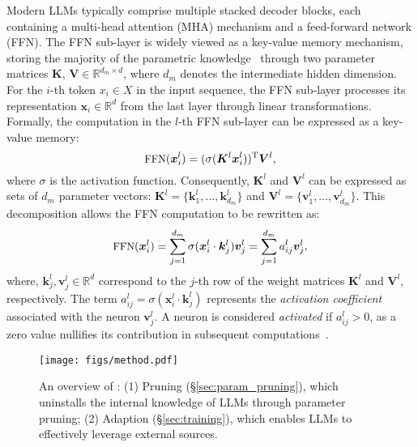 Modern LLMs typically comprise multiple stacked decoder blocks, each containing a multi-head attention (MHA) mechanism and a feed-forward network (FFN). The FFN sub-layer is widely viewed as a key-value memory mechanism, storing the majority of the parametric knowledge~\cite{geva2020transformer} through two parameter matrices $\bm{K}$, $\bm{V} \in \mathbb{R}^{d_m \times d}$, where $d_m$ denotes the intermediate hidden dimension. For the $i$-th token $x_i \in X$ in the input sequence, the FFN sub-layer processes its representation $\bm{x}_i \in \mathbb{R}^{d}$ from the last layer through linear transformations. Formally, the computation in the $l$-th FFN sub-layer can be expressed as a key-value memory:
\begin{equation}\small
    \label{eq:ffn_describe}
    \text{FFN}(\bm{x}_i^l) = (\sigma(\bm{K}^l \bm{x}_i^l ))^\mathrm{T}\bm{V}^l,
\end{equation}
where $\sigma$ is the activation function. Consequently, $\bm{K}^l$ and $\bm{V}^l$ can be expressed as sets of $d_m$ parameter vectors: $\bm{K}^l = \{\bm{k}_1^l, \dots, \bm{k}_{d_m}^l\}$ and $\bm{V}^l = \{\bm{v}_1^l, \dots, \bm{v}_{d_m}^l\}$. This decomposition allows the FFN computation to be rewritten as:
\begin{equation}\small
    \label{eq:ffn_describe_decomposed}
    \text{FFN}(\bm{x}_i^l) = \sum_{j=1}^{d_m} \sigma(\bm{x}_i^l \cdot \bm{k}_j^l)\bm{v}_j^l = \sum_{j=1}^{d_m}a_{ij}^l\bm{v}_j^l,
\end{equation}
where, $\bm{k}_j^l, \bm{v}_j^l \in \mathbb{R}^d$ correspond to the $j$-th row of the weight matrices $\bm{K}^l$ and $\bm{V}^l$, respectively. The term $a_{ij}^l = \sigma(\bm{x}_i^l \cdot \bm{k}_j^l)$ represents the \textit{activation coefficient} associated with the neuron $\bm{v}_j^l$. A neuron is considered \textit{activated} if $a_{ij}^l > 0$, as a zero value nullifies its contribution in subsequent computations~\cite{mu2024revealing}.

\begin{figure}[!t]
    \centering

    \texttt{[image: figs/method.pdf]}
  \caption{An overview of \method{}: (1) Pruning (\S\ref{sec:param_pruning}), which uninstalls the internal knowledge of LLMs through parameter pruning; (2) Adaption (\S\ref{sec:training}), which enables LLMs to effectively leverage external sources.
  }
  \label{fig:our_method}
\end{figure}

